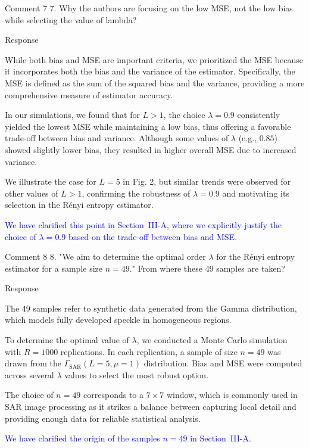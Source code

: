 \documentclass[11pt]{report}
\begin{document}
\vspace{2em} 
\begin{reviewbox}{Comment 7}
7. Why the authors are focusing on the low MSE, not the low bias while selecting the value of lambda?
\end{reviewbox}

\begin{responsebox}{Response}

While both bias and MSE are important criteria, we prioritized the MSE because it incorporates both the bias and the variance of the estimator. 
Specifically, the MSE is defined as the sum of the squared bias and the variance, providing a more comprehensive measure of estimator accuracy.

In our simulations, we found that for $L > 1$, the choice $\lambda = 0.9$ consistently yielded the lowest MSE while maintaining a low bias, thus offering a favorable trade-off between bias and variance. Although some values of $\lambda$ (e.g., $0.85$) showed slightly lower bias, they resulted in higher overall MSE due to increased variance.

We illustrate the case for $L = 5$ in Fig. 2, but similar trends were observed for other values of $L > 1$, confirming the robustness of $\lambda = 0.9$ and motivating its selection in the Rényi entropy estimator.

\textcolor{blue}{We have clarified this point in Section~III-A, where we explicitly justify the choice of $\lambda = 0.9$ based on the trade-off between bias and MSE.}

\end{responsebox}

\vspace{2em}


\begin{reviewbox}{Comment 8}
8. "We aim to determine the optimal order $\lambda$ for the Rényi entropy estimator for a sample size $n=49$." From where these 49 samples are taken?
\end{reviewbox}

\begin{responsebox}{Response}



The 49 samples refer to synthetic data generated from the Gamma distribution, which models fully developed speckle in homogeneous regions.

To determine the optimal value of $\lambda$, we conducted a Monte Carlo simulation with $R = 1000$ replications. In each replication, a sample of size $n = 49$ was drawn from the $\Gamma_{\text{SAR}}(L = 5, \mu = 1)$ distribution. Bias and MSE were computed across several $\lambda$ values to select the most robust option.

The choice of $n = 49$ corresponds to a $7 \times 7$ window, which is commonly used in SAR image processing as it strikes a balance between capturing local detail and providing enough data for reliable statistical analysis.

\textcolor{blue}{We have clarified the origin of the samples $n = 49$ in Section~III-A.}
\end{responsebox}
\end{document}
